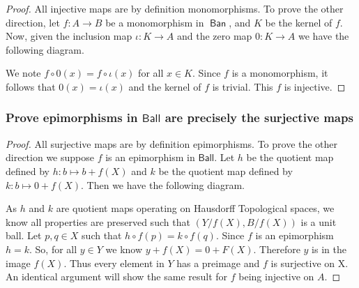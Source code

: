 \documentclass{article}
\DeclareMathOperator{\ban}{\textsf{Ban}}
\begin{document}
\begin{proof}
	
	All injective maps are by definition monomorphisms.
	To prove the other direction, let $f:A\rightarrow B$ be a monomorphism in $\ban$, and $K$ be the kernel of $f$.
	Now, given the inclusion map $\iota:K\rightarrow A$ and the zero map $0:K\rightarrow A$ we have the following diagram.
	\begin{center}
	\end{center}
	
	\noindent We note $f\circ 0(x)=f\circ \iota(x)$ for all $x\in K$.
	Since $f$ is a monomorphism, it follows that $0(x)=\iota(x)$ and the kernel of $f$ is trivial.
	This $f$ is injective.
	
	
\end{proof}

\subsubsection{Prove epimorphisms in $\textsf{Ball}$ are precisely the surjective maps}

\begin{proof}
	
	All surjective maps are by definition epimorphisms.
	To prove the other direction we suppose $f$ is an epimorphism in $\textsf{Ball}$.
	Let $h$ be the quotient map defined by $h:b \mapsto b+f(X)$ and $k$ be the quotient map defined by $k:b \mapsto 0+f(X)$. Then we have the following diagram.
	
	\begin{center}
	\end{center}
	
	\noindent As $h$ and $k$ are quotient maps operating on Hausdorff Topological spaces, we know all properties are preserved such that $(Y/f(X),B/f(X))$ is a unit ball.
	Let $p,q\in X$ such that $h\circ f(p)=k\circ f(q)$.
	Since $f$ is an epimorphism $h=k$.
	So, for all $y\in Y$ we know $y+f(X)=0+F(X)$.
	Therefore $y$ is in the image $f(X)$.
	Thus every element in $Y$ has a preimage and $f$ is surjective on X.
	An identical argument will show the same result for $f$ being injective on $A$.
	
\end{proof}
\end{document}
